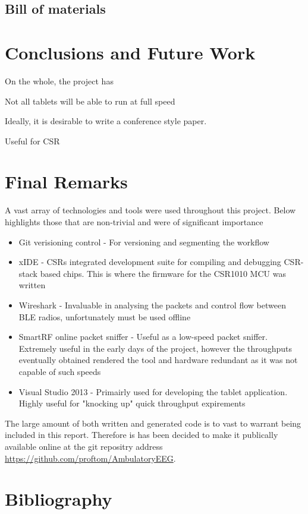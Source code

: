 \documentclass[]{article}
\begin{document}
{\subsection{Bill of materials}

\section{Conclusions and Future Work}
On the whole, the project has 

Not all tablets will be able to run at full speed

Ideally, it is desirable to write a conference style paper. 

Useful for CSR
\section{Final Remarks}
A vast array of technologies and tools were used throughout this project. Below highlights those that are non-trivial and were of significant importance

\begin{itemize}
	\item Git verisioning control - For versioning and segmenting the workflow
	\item xIDE - CSRs integrated development suite for compiling and debugging CSR-stack based chips. This is where the firmware for the CSR1010 MCU was written
	\item Wireshark - Invaluable in analysing the packets and control flow between BLE radios, unfortunately must be used offline
	\item SmartRF online packet sniffer - Useful as a low-speed packet sniffer. Extremely useful in the early days of the project, however the throughputs eventually obtained rendered the tool and hardware redundant as it was not capable of such speeds
	\item Visual Studio 2013 - Primairly used for developing the tablet application. Highly useful for "knocking up" quick throughput expirements 
\end{itemize}

The large amount of both written and generated code is to vast to warrant being included in this report. Therefore is has been decided to make it publically available online at the git repositry address 
\url{https://github.com/proftom/AmbulatoryEEG}.

\section{Bibliography}
\clearpage

}
\end{document}
